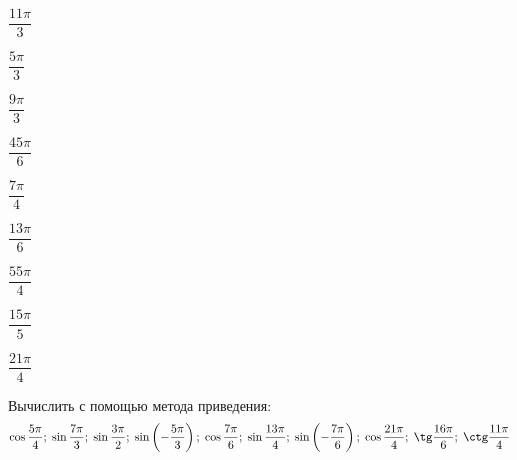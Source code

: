 \begin{class}[number=4]
\begin{listofex}[resume]
\begin{enumcols}[itemcolumns=5]
			\item \( \dfrac{11\pi}{3} \)
			\item \( \dfrac{5\pi}{3} \)
			\item \( \dfrac{9\pi}{3} \)
			\item \( \dfrac{45\pi}{6} \)
			\item \( \dfrac{7\pi}{4} \)
			\item \( \dfrac{13\pi}{6} \)
			\item \( \dfrac{55\pi}{4} \)
			\item \( \dfrac{15\pi}{5} \)
			\item \( \dfrac{21\pi}{4} \)
		\end{enumcols}
		\item Вычислить с помощью метода приведения:
		\[ \cos\dfrac{5\pi}{4};\;\sin\dfrac{7\pi}{3};\;\sin\dfrac{3\pi}{2};\;\sin\left( -\dfrac{5\pi}{3} \right);\;\cos\dfrac{7\pi}{6};\;\sin\dfrac{13\pi}{4};\;\sin\left( -\dfrac{7\pi}{6}  \right);\;\cos\dfrac{21\pi}{4};\;\tg\dfrac{16\pi}{6};\;\ctg\dfrac{11\pi}{4} \]
	\end{listofex}
\end{class}
%
%
%
%
%
